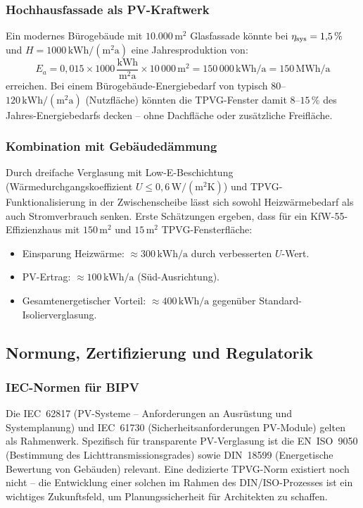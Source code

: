 ﻿\documentclass[a4paper,12pt]{article}
\theoremstyle{definition}
\theoremstyle{remark}
\begin{document}
\subsubsection{Hochhausfassade als PV-Kraftwerk}
Ein modernes Bürogebäude mit $10.000\,\mathrm{m^2}$ Glasfassade könnte bei
$\eta_{\rm sys} = 1{,}5\,\%$ und $H = 1000\,\mathrm{kWh/(m^2 a)}$
eine Jahresproduktion von:
\begin{equation*}
  E_a = 0{,}015 \times 1000\,\frac{\mathrm{kWh}}{\mathrm{m^2 a}} \times 10\,000\,\mathrm{m^2}
      = 150\,000\,\mathrm{kWh/a} = 150\,\mathrm{MWh/a}
\end{equation*}
erreichen. Bei einem Bürogebäude-Energiebedarf von typisch
$80$--$120\,\mathrm{kWh/(m^2 a)}$ (Nutzfläche) könnten die TPVG-Fenster
damit $8$--$15\,\%$ des Jahres-Energiebedarfs decken -- ohne Dachfläche
oder zusätzliche Freifläche.

\subsubsection{Kombination mit Gebäudedämmung}
Durch dreifache Verglasung mit Low-E-Beschichtung (Wärmedurchgangskoeffizient
$U \leq 0{,}6\,\mathrm{W/(m^2 K)}$) und TPVG-Funktionalisierung in
der Zwischenscheibe lässt sich sowohl Heizwärmebedarf als auch
Stromverbrauch senken. Erste Schätzungen ergeben,
dass für ein KfW-55-Effizienzhaus mit $150\,\mathrm{m^2}$ und
$15\,\mathrm{m^2}$ TPVG-Fensterfläche:
\begin{itemize}
  \item Einsparung Heizwärme: $\approx 300\,\mathrm{kWh/a}$ durch
    verbesserten $U$-Wert.
  \item PV-Ertrag: $\approx 100\,\mathrm{kWh/a}$ (Süd-Ausrichtung).
  \item Gesamtenergetischer Vorteil: $\approx 400\,\mathrm{kWh/a}$
    gegenüber Standard-Isolierverglasung.
\end{itemize}

\subsection{Normung, Zertifizierung und Regulatorik}

\subsubsection{IEC-Normen für BIPV}
Die IEC~62817 (PV-Systeme -- Anforderungen an Ausrüstung und
Systemplanung) und IEC~61730 (Sicherheitsanforderungen PV-Module) gelten
als Rahmenwerk. Spezifisch für transparente PV-Verglasung ist die
EN~ISO~9050 (Bestimmung des Lichttransmissionsgrades) sowie
DIN~18599 (Energetische Bewertung von Gebäuden) relevant. Eine
dedizierte TPVG-Norm existiert noch nicht -- die Entwicklung einer
solchen im Rahmen des DIN/ISO-Prozesses ist ein wichtiges
Zukunftsfeld, um Planungssicherheit für Architekten zu schaffen.
\end{document}
